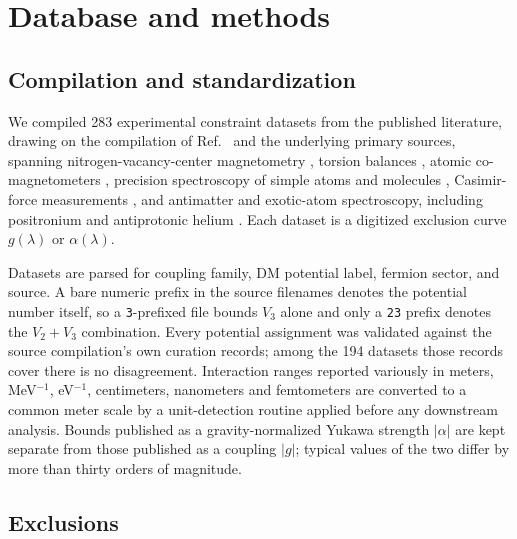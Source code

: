 \documentclass[
  aps,
  prd,
  reprint,
  amsmath,
  amssymb,
  nofootinbib,
  superscriptaddress,
  floatfix
]{revtex4-2}
\begin{document}
\section{Database and methods}
\label{sec:methods}

\subsection{Compilation and standardization}

We compiled 283 experimental constraint datasets from the published
literature, drawing on the compilation of Ref.~\cite{Cong2025} and the
underlying primary sources, spanning nitrogen-vacancy-center magnetometry
\cite{Rong2018a,Rong2018b,Jiao2020}, torsion balances
\cite{Hoskins1985,Kapner2007,Heckel2008,Tan2020,Lee2020}, atomic
co-magnetometers \cite{Vasilakis2009}, precision spectroscopy of simple
atoms and molecules
\cite{Alighanbari2020,Salumbides2014,Delaunay2017,Ficek2017}, Casimir-force
measurements \cite{Bordag2001,Chen2016}, and antimatter and exotic-atom
spectroscopy, including positronium and antiprotonic helium
\cite{Adkins2022,Ficek2018,Fadeev2022}. Each dataset is a digitized exclusion curve $g(\lambda)$ or
$\alpha(\lambda)$.

Datasets are parsed for coupling family, DM potential label, fermion
sector, and source. A bare numeric prefix in the source filenames denotes
the potential number itself, so a \texttt{3}-prefixed file bounds $V_3$
alone and only a \texttt{23} prefix denotes the $V_2+V_3$ combination.
Every potential assignment was validated against the source compilation's
own curation records; among the 194 datasets those records cover there is
no disagreement. Interaction ranges reported variously in meters,
MeV$^{-1}$, eV$^{-1}$, centimeters, nanometers and femtometers are
converted to a common meter scale by a unit-detection routine applied
before any downstream analysis. Bounds published as a gravity-normalized
Yukawa strength $|\alpha|$ are kept separate from those published as a
coupling $|g|$; typical values of the two differ by more than thirty
orders of magnitude.

\subsection{Exclusions}
\end{document}
